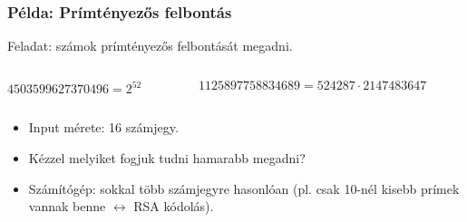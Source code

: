 \begin{frame}[t]
\frametitle{Példa: Prímtényezős felbontás}

Feladat: számok prímtényezős felbontását megadni.

\mkspace
\begin{columns}
\begin{column}{0.487\textwidth}
$4503599627370496 = 2^{52}$
\end{column}
\begin{column}{0.487\textwidth}
$1125897758834689 = 524287 \cdot 2147483647$
\end{column}
\end{columns}
\mkspace

\begin{itemize}
\item Input mérete: 16 számjegy.
\item Kézzel melyiket fogjuk tudni hamarabb megadni?
\item Számítógép: sokkal több számjegyre hasonlóan (pl. csak 10-nél kisebb prímek vannak benne $\leftrightarrow$ RSA kódolás).
\end{itemize}


\end{frame}

